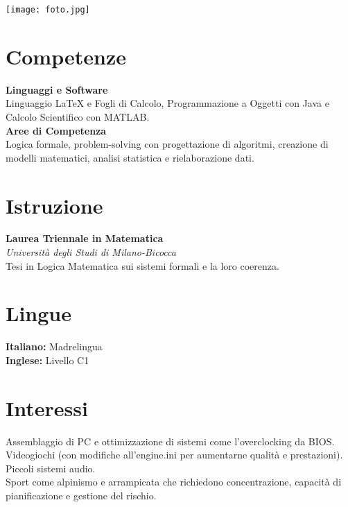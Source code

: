 \documentclass[10pt, a4paper]{article}
\begin{document}
	\begin{minipage}[t]{0.35\textwidth}	          %

		\phantom{ciao!}		%
		\begin{center}
			\texttt{[image: foto.jpg]} %
		\end{center}
		\vspace{-3pt}
			
		\section*{Competenze}
			
			\textbf{Linguaggi e Software} \vspace{3pt} \\ 
			Linguaggio LaTeX e Fogli di Calcolo, Programmazione a Oggetti con Java e Calcolo Scientifico con MATLAB.
			\vspace{3mm} \\
			\textbf{Aree di Competenza} \\
			Logica formale, problem-solving con progettazione di algoritmi, creazione di modelli matematici, analisi statistica e rielaborazione dati.
			\vspace{3pt}
			
		\section*{Istruzione}
		
			\textbf{Laurea Triennale in Matematica} \\
			\textit{Università degli Studi di Milano-Bicocca} \vspace{0pt} \\
			Tesi in Logica Matematica sui sistemi formali e la loro coerenza.
			\vspace{3pt}
			
		\section*{Lingue}
		
			\textbf{Italiano:} Madrelingua \\
			\textbf{Inglese:} Livello C1
			\vspace{3pt}
			
		\section*{Interessi}
		
			Assemblaggio di PC e ottimizzazione di sistemi come l'overclocking da BIOS. \\ Videogiochi (con modifiche all'engine.ini per aumentarne qualità e prestazioni).\\ Piccoli sistemi audio. \\
			Sport come alpinismo e arrampicata che richiedono concentrazione, capacità di pianificazione e gestione del rischio.
			
	\end{minipage}
\end{document}
